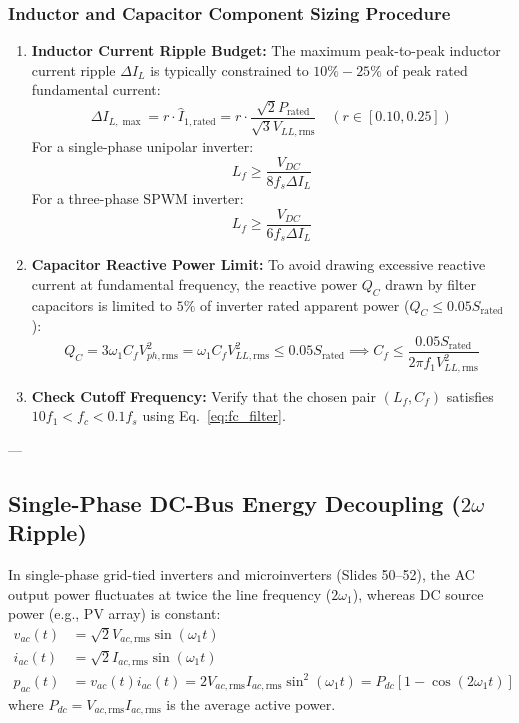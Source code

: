 \subsubsection{Inductor and Capacitor Component Sizing Procedure}
\begin{enumerate}
  \item \textbf{Inductor Current Ripple Budget:}
  The maximum peak-to-peak inductor current ripple $\Delta I_L$ is typically constrained to $10\% - 25\%$ of peak rated fundamental current:
  \begin{equation}
  \Delta I_{L,\max} = r \cdot \hat{I}_{1,\mathrm{rated}} = r \cdot \frac{\sqrt{2} P_{\mathrm{rated}}}{\sqrt{3} V_{LL,\mathrm{rms}}} \quad (r \in [0.10, 0.25])
  \end{equation}
  For a single-phase unipolar inverter:
  \begin{equation}
  L_f \ge \frac{V_{DC}}{8 f_s \Delta I_L}
  \end{equation}
  For a three-phase SPWM inverter:
  \begin{equation}
  L_f \ge \frac{V_{DC}}{6 f_s \Delta I_L}
  \end{equation}
  \item \textbf{Capacitor Reactive Power Limit:}
  To avoid drawing excessive reactive current at fundamental frequency, the reactive power $Q_C$ drawn by filter capacitors is limited to $5\%$ of inverter rated apparent power ($Q_C \le 0.05 S_{\mathrm{rated}}$):
  \begin{equation}
  Q_C = 3 \omega_1 C_f V_{ph,\mathrm{rms}}^2 = \omega_1 C_f V_{LL,\mathrm{rms}}^2 \le 0.05 S_{\mathrm{rated}} \implies C_f \le \frac{0.05 S_{\mathrm{rated}}}{2\pi f_1 V_{LL,\mathrm{rms}}^2}
  \end{equation}
  \item \textbf{Check Cutoff Frequency:}
  Verify that the chosen pair $(L_f, C_f)$ satisfies $10 f_1 < f_c < 0.1 f_s$ using Eq.~\ref{eq:fc_filter}.
\end{enumerate}

---

\subsection{Single-Phase DC-Bus Energy Decoupling (\texorpdfstring{$2\omega$}{2-omega} Ripple)}

In single-phase grid-tied inverters and microinverters (Slides 50--52), the AC output power fluctuates at twice the line frequency ($2\omega_1$), whereas DC source power (e.g., PV array) is constant:
\begin{align}
v_{ac}(t) &= \sqrt{2} V_{ac,\mathrm{rms}} \sin(\omega_1 t) \\
i_{ac}(t) &= \sqrt{2} I_{ac,\mathrm{rms}} \sin(\omega_1 t) \\
p_{ac}(t) &= v_{ac}(t) i_{ac}(t) = 2 V_{ac,\mathrm{rms}} I_{ac,\mathrm{rms}} \sin^2(\omega_1 t) = P_{dc} \left[1 - \cos(2\omega_1 t)\right]
\end{align}
where $P_{dc} = V_{ac,\mathrm{rms}} I_{ac,\mathrm{rms}}$ is the average active power.

